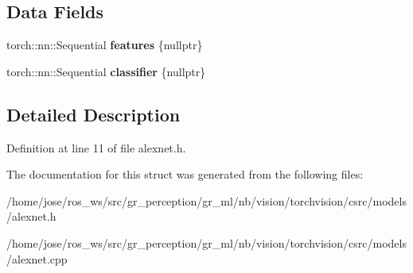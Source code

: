 \subsection*{Data Fields}
\begin{DoxyCompactItemize}
\item 
\mbox{\label{structvision_1_1models_1_1AlexNetImpl_ab2534960e6a6c7bbd106a839240dd115}} 
torch\+::nn\+::\+Sequential {\bfseries features} \{nullptr\}
\item 
\mbox{\label{structvision_1_1models_1_1AlexNetImpl_a5c2bbb6aaba8032c3567b020e2448a17}} 
torch\+::nn\+::\+Sequential {\bfseries classifier} \{nullptr\}
\end{DoxyCompactItemize}


\subsection{Detailed Description}


Definition at line 11 of file alexnet.\+h.



The documentation for this struct was generated from the following files\+:\begin{DoxyCompactItemize}
\item 
/home/jose/ros\+\_\+ws/src/gr\+\_\+perception/gr\+\_\+ml/nb/vision/torchvision/csrc/models/alexnet.\+h\item 
/home/jose/ros\+\_\+ws/src/gr\+\_\+perception/gr\+\_\+ml/nb/vision/torchvision/csrc/models/alexnet.\+cpp\end{DoxyCompactItemize}

